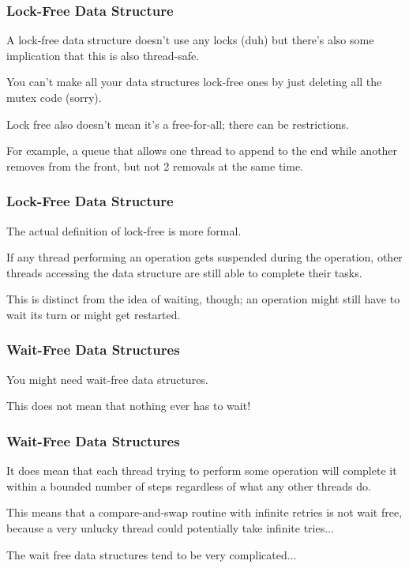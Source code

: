 \begin{frame}
\frametitle{Lock-Free Data Structure}
A lock-free data structure doesn't use any locks (duh) but there's also some implication that this is also thread-safe.

You can't make all your data structures lock-free ones by just deleting all the mutex code (sorry). 

Lock free also doesn't mean it's a free-for-all; there can be restrictions. 

For example, a queue that allows one thread to append to the end while another removes from the front, but not 2 removals at the same time.
\end{frame}



\begin{frame}
\frametitle{Lock-Free Data Structure}

The actual definition of lock-free is more formal. 

If any thread performing an operation gets suspended during the operation, other threads accessing the data structure are still able to complete their tasks.

This is distinct from the idea of waiting, though; an operation might still have to wait its turn or might get restarted.

\end{frame}



\begin{frame}
\frametitle{Wait-Free Data Structures}

You might need wait-free data structures. 

This does not mean that nothing ever has to wait! 

\end{frame}



\begin{frame}
\frametitle{Wait-Free Data Structures}


It does mean that each thread trying to perform some operation will complete it within a bounded number of steps regardless of what any other threads do. 

This means that a compare-and-swap routine with infinite retries is not wait free, because a very unlucky thread could potentially take infinite tries...

The wait free data structures tend to be very complicated...

\end{frame}


